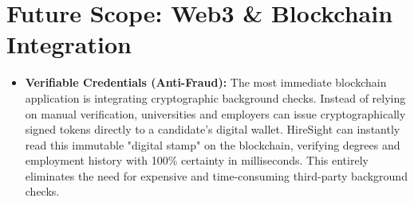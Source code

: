 \documentclass[12pt, a4paper]{article}
\begin{document}
\section{Future Scope: Web3 \& Blockchain Integration}
\begin{itemize}
    \item \textbf{Verifiable Credentials (Anti-Fraud):} The most immediate blockchain application is integrating cryptographic background checks. Instead of relying on manual verification, universities and employers can issue cryptographically signed tokens directly to a candidate's digital wallet. HireSight can instantly read this immutable "digital stamp" on the blockchain, verifying degrees and employment history with 100\% certainty in milliseconds. This entirely eliminates the need for expensive and time-consuming third-party background checks.
\end{itemize}

\vspace{0.5cm}
\end{document}

